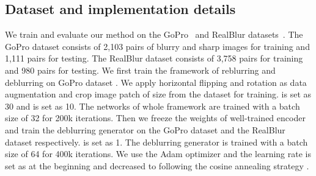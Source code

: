 \documentclass[runningheads]{llncs}
\begin{document}
\subsection{Dataset and implementation details}
We train and evaluate our method on the GoPro~\cite{deblur-multi-scale} and RealBlur datasets~\cite{realblur}. The GoPro dataset consists of 2,103 pairs of blurry and sharp images for training and 1,111 pairs for testing. The RealBlur dataset consists of 3,758 pairs for training and 980 pairs for testing. We first train the framework of reblurring and deblurring on GoPro dataset \cite{deblur-multi-scale}. 
We apply horizontal flipping and rotation as data augmentation and crop image patch of size  from the dataset for training.
 is set as 30 and  is set as 10. 
The networks of whole framework are trained with a batch size of 32 for 200k iterations. 
Then we freeze the weights of well-trained encoder  and train the deblurring generator  on the GoPro dataset \cite{deblur-multi-scale} and the RealBlur dataset \cite{realblur} respectively.  is set as 1. 
The deblurring generator  is trained with a batch size of 64 for 400k iterations.
We use the Adam optimizer and the learning rate is set as  at the beginning and decreased to  following the cosine annealing strategy \cite{cosine_annealing}. 
\end{document}
